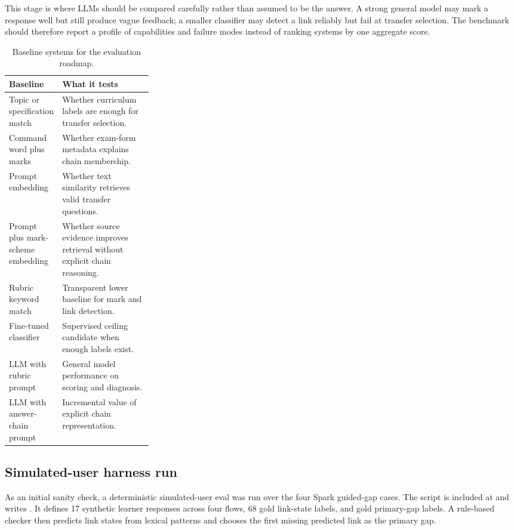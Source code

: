 \documentclass[11pt]{article}
\begin{document}
This stage is where LLMs should be compared carefully rather than assumed to be the answer. A strong general model may mark a response well but still produce vague feedback; a smaller classifier may detect a link reliably but fail at transfer selection. The benchmark should therefore report a profile of capabilities and failure modes instead of ranking systems by one aggregate score.

\begin{table}[H]
\centering
\small
\begin{tabularx}{\linewidth}{L{0.28\linewidth}Y}
\toprule
\textbf{Baseline} & \textbf{What it tests}\\
\midrule
Topic or specification match & Whether curriculum labels are enough for transfer selection.\\
Command word plus marks & Whether exam-form metadata explains chain membership.\\
Prompt embedding & Whether text similarity retrieves valid transfer questions.\\
Prompt plus mark-scheme embedding & Whether source evidence improves retrieval without explicit chain reasoning.\\
Rubric keyword match & Transparent lower baseline for mark and link detection.\\
Fine-tuned classifier & Supervised ceiling candidate when enough labels exist.\\
LLM with rubric prompt & General model performance on scoring and diagnosis.\\
LLM with answer-chain prompt & Incremental value of explicit chain representation.\\
\bottomrule
\end{tabularx}
\caption{Baseline systems for the evaluation roadmap.}
\label{tab:baselines}
\end{table}

\subsection{Simulated-user harness run}

As an initial sanity check, a deterministic simulated-user eval was run over the four Spark guided-gap cases. The script is included at  and writes . It defines 17 synthetic learner responses across four flows, 68 gold link-state labels, and gold primary-gap labels. A rule-based checker then predicts link states from lexical patterns and chooses the first missing predicted link as the primary gap.
\end{document}
